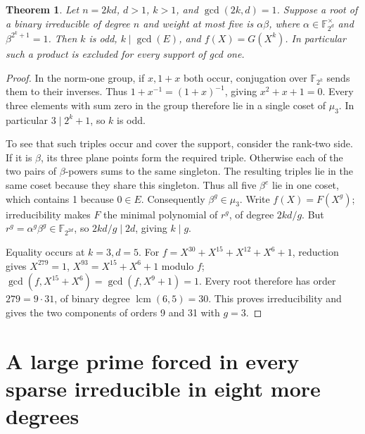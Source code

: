 \documentclass[11pt]{article}
\newtheorem{theorem}{Theorem}
\begin{document}
\begin{theorem}\label{thm:circle-dilation}
Let \(n=2kd\), \(d>1\), \(k>1\), and \(\gcd(2k,d)=1\).
Suppose a root of a binary irreducible of degree \(n\) and weight
at most five is \(\alpha\beta\), where \(\alpha\in\mathbb F_{2^d}^\times\)
and \(\beta^{2^k+1}=1\). Then \(k\) is odd, \(k\mid\gcd(E)\), and
\(f(X)=G(X^k)\). In particular such a product is excluded for every
support of gcd one.
\end{theorem}
\begin{proof}
In the norm-one group, if \(x,1+x\) both occur, conjugation over
\(\mathbb F_{2^k}\) sends them to their inverses. Thus
\(1+x^{-1}=(1+x)^{-1}\), giving \(x^2+x+1=0\). Every
three elements with sum zero in the group therefore lie in a
single coset of \(\mu_3\). In particular \(3\mid 2^k+1\),
so \(k\) is odd.

To see that such triples occur and cover the support, consider the
rank-two side. If it is \(\beta\), its three plane points form the
required triple. Otherwise each of the two pairs of \(\beta\)-powers
sums to the same singleton. The resulting triples lie in the same
coset because they share this singleton. Thus all five
\(\beta^e\) lie in one coset, which contains 1 because \(0\in E\).
Consequently \(\beta^g\in\mu_3\).
Write \(f(X)=F(X^g)\); irreducibility makes \(F\) the minimal
polynomial of \(r^g\), of degree \(2kd/g\).
But \(r^g=\alpha^g\beta^g\in\mathbb F_{2^{2d}}\), so
\(2kd/g\mid2d\), giving \(k\mid g\).

Equality occurs at \(k=3,d=5\). For
\(f=X^{30}+X^{15}+X^{12}+X^6+1\), reduction gives
\(X^{279}=1\), \(X^{93}=X^{15}+X^6+1\) modulo \(f\);
\(\gcd(f,X^{15}+X^6)=\gcd(f,X^9+1)=1\).
Every root therefore has order \(279=9\cdot31\), of binary degree
\(\operatorname{lcm}(6,5)=30\). This proves irreducibility and gives
the two components of orders 9 and 31 with \(g=3\).
\end{proof}

\clearpage
\section{A large prime forced in every sparse irreducible in eight more degrees}
\label{sec:scalar-pair-census}
\end{document}

